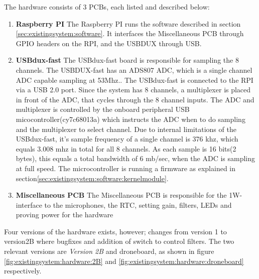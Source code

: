The hardware consists of 3 PCBs, each listed and described below:
\begin{enumerate}
	\item \textbf{Raspberry PI} The Raspberry PI runs the software described in section \ref{sec:existingsystem:software}. It interfaces the Miscellaneous PCB through GPIO headers on the RPI, and the USBDUX through USB.
	
	\item \textbf{USBdux-fast} The USBdux-fast board is responsible for sampling the 8 channels. The USBDUX-fast has an ADS807 ADC, which is a single channel ADC capable sampling at 53Mhz.. The USBdux-fast is connected to the RPI via a USB 2.0 port.
Since the system has 8 channels, a multiplexer is placed in front of the ADC, that cycles through the 8 channel inputs.
The ADC and multiplexer is controlled by the onboard peripheral USB micocontroller(cy7c68013a) which instructs the ADC when to do sampling and the multiplexer to select channel. Due to internal limitations of the USBdux-fast, it's sample frequency of a single channel is 376 khz, which equals 3.008 mhz in total for all 8 channels. As each sample is 16 bits(2 bytes), this equals a total bandwidth of 6 mb/sec, when the ADC is sampling at full speed. The microcontroller is running a firmware as explained in section\ref{sec:existingsystem:software:kernelmodule}.
	
	\item \textbf{Miscellaneous PCB} The Miscellaneous PCB is responsible for the 1W-interface to the microphones, the RTC, setting gain, filters, LEDs and proving power for the hardware
\end{enumerate}

Four versions of the hardware exists, however; changes from version 1 to version2B where bugfixes and addition of switch to control filters. The two relevant versions are \textit{Version 2B} and droneboard, as shown in figure \ref{fig:existingsystem:hardware:2B} and \ref{fig:existingsystem:hardware:droneboard} respectively.

